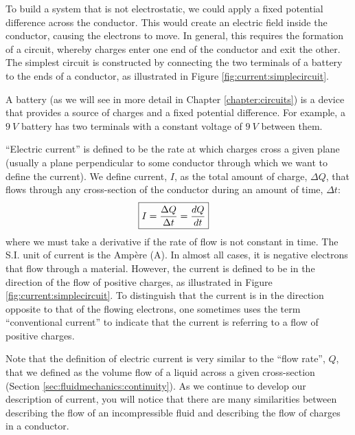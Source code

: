 To build a system that is not electrostatic, we could apply a fixed potential difference across the conductor. This would create an  electric field inside the conductor, causing the electrons to move. In general, this requires the formation of a circuit, whereby charges enter one end of the conductor and exit the other. The simplest circuit is constructed by connecting the two terminals of a battery to the ends of a conductor, as illustrated in Figure \ref{fig:current:simplecircuit}. 


A battery (as we will see in more detail in Chapter \ref{chapter:circuits}) is a device that provides a source of charges and a fixed potential difference. For example, a $\SI{9}{V}$ battery has two terminals with a constant voltage of $\SI{9}{V}$ between them.


``Electric current'' is defined to be the rate at which charges cross a given plane (usually a plane perpendicular to some conductor through which we want to define the current). We define current, $I$, as the total amount of charge, $\Delta Q$, that flows through any cross-section of the conductor during an amount of time, $\Delta t$:
\begin{align*}
\Aboxed{I=\frac{\Delta Q}{\Delta t}=\frac{dQ}{dt}}
\end{align*}
where we must take a derivative if the rate of flow is not constant in time. The S.I. unit of current is the Amp\`ere (\si{A}). In almost all cases, it is negative electrons that flow through a material. However, the current is defined to be in the direction of the flow of positive charges, as illustrated in Figure \ref{fig:current:simplecircuit}. To distinguish that the current is in the direction opposite to that of the flowing electrons, one sometimes uses the term ``conventional current'' to indicate that the current is referring to a flow of positive charges.

Note that the definition of electric current is very similar to the ``flow rate'', $Q$, that we defined as the volume flow of a liquid across a given cross-section (Section \ref{sec:fluidmechanics:continuity}). As we continue to develop our description of current, you will notice that there are many similarities between describing the flow of an incompressible fluid and describing the flow of charges in a conductor.


